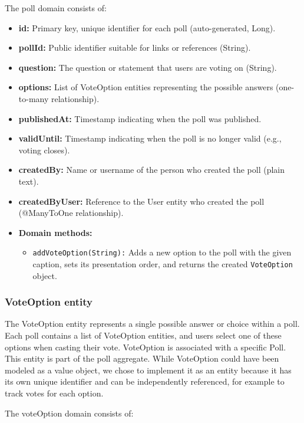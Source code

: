 The poll domain consists of:

\begin{itemize}
    \item \textbf{id:} Primary key, unique identifier for each poll (auto-generated, Long).
    \item \textbf{pollId:} Public identifier suitable for links or references (String).
    \item \textbf{question:} The question or statement that users are voting on (String).
    \item \textbf{options:} List of VoteOption entities representing the possible answers (one-to-many relationship).
    \item \textbf{publishedAt:} Timestamp indicating when the poll was published.
    \item \textbf{validUntil:} Timestamp indicating when the poll is no longer valid (e.g., voting closes).
    \item \textbf{createdBy:} Name or username of the person who created the poll (plain text).
    \item \textbf{createdByUser:} Reference to the User entity who created the poll (@ManyToOne relationship).
    \item \textbf{Domain methods:}
        \begin{itemize}
            \item \texttt{addVoteOption(String):} Adds a new option to the poll with the given caption, sets its presentation order, and returns the created \texttt{VoteOption} object.
        \end{itemize}
\end{itemize}

\subsubsection{VoteOption entity}

The VoteOption entity represents a single possible answer or choice within a poll. Each poll contains a list of VoteOption entities, and users select one of these options when casting their vote. VoteOption is associated with a specific Poll. This entity is part of the poll aggregate. While VoteOption could have been modeled as a value object, we chose to implement it as an entity because it has its own unique identifier and can be independently referenced, for example to track votes for each option.


The voteOption domain consists of:

